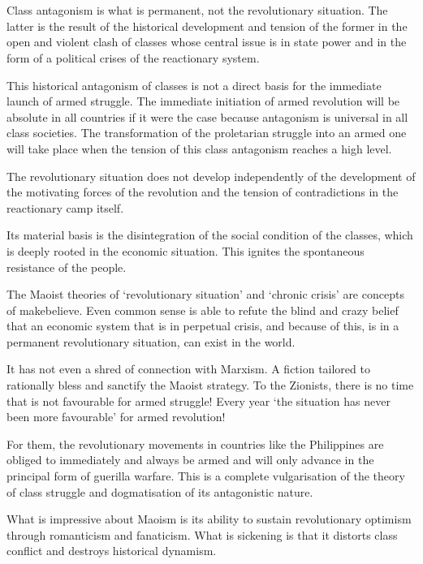 \documentclass[a4paper,11pt,onesided]{report}
\begin{document}
\section{}
Class antagonism is what is permanent, not the revolutionary situation. 
The latter is the result of the historical development and tension of the former 
in the open and violent clash of classes 
whose central issue is in state power 
and in the form of a political crises of the reactionary system.

This historical antagonism of classes is not a direct basis 
for the immediate launch of armed struggle. 
The immediate initiation of armed revolution will be absolute in all countries 
if it were the case 
because antagonism is universal in all class societies. 
The transformation of the proletarian struggle into an armed one 
will take place when the tension of this class antagonism
reaches a high level.

The revolutionary situation does not develop independently 
of the development of the motivating forces of the revolution 
and the tension of contradictions in the reactionary camp itself.

Its material basis is the disintegration of the social condition of the classes, 
which is deeply rooted in the economic situation. 
This ignites the spontaneous resistance of the people.

The Maoist theories of `revolutionary situation' and `chronic crisis' 
are concepts of makebelieve. 
Even common sense is able to refute the blind and crazy belief 
that an economic system that is in perpetual crisis, and
because of this, is in a permanent revolutionary situation, 
can exist in the world.

It has not even a shred of connection with Marxism. 
A fiction tailored to rationally bless and sanctify the Maoist strategy. 
To the Zionists, there is no time that is not favourable for armed struggle! 
Every year `the situation has never been more favourable' for armed revolution!

For them, the revolutionary movements in countries like the Philippines 
are obliged to immediately and always be armed 
and will only advance in the principal form of guerilla warfare. 
This is a complete vulgarisation of the theory of class struggle and 
dogmatisation of its antagonistic nature.

What is impressive about Maoism is its ability to sustain 
revolutionary optimism through romanticism and fanaticism. 
What is sickening is that it distorts class conflict 
and destroys historical dynamism.
\end{document}
